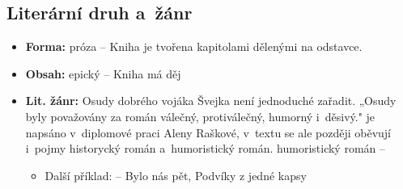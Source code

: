 \subsection{Literární druh a~žánr}
\begin{itemize}
    \item \textbf{Forma:} próza -- Kniha je tvořena kapitolami dělenými na odstavce.
    \item \textbf{Obsah:} epický -- Kniha má děj
    \item \textbf{Lit. žánr:} Osudy dobrého vojáka Švejka není jednoduché zařadit. „Osudy byly považovány za román válečný, protiválečný, humorný i~děsivý."\cite[8]{interpretace_postavy_josefa_svejka} je napsáno v~diplomové praci Aleny Raškové, v~textu se ale později oběvují i~pojmy historycký román a~humoristický román. humoristický román -- 
    \begin{itemize}
        \item Další příklad: \textit{} -- Bylo nás pět, Podvíky z jedné kapsy
    \end{itemize}
\end{itemize}

\newpage

